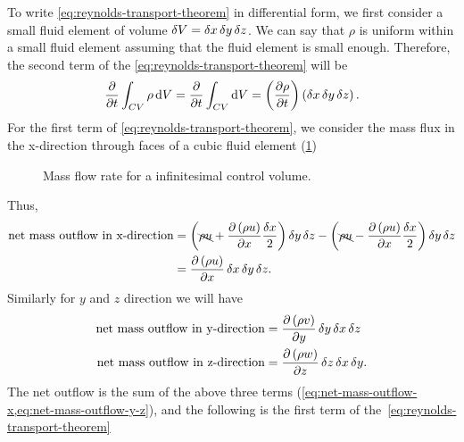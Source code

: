To write \cref{eq:reynolds-transport-theorem} in differential form, we first consider a small fluid element of volume \(\mathop{}\!\delta V = \mathop{}\!\delta x \mathop{}\!\delta y \mathop{}\!\delta z\). We can say that \(\rho\) is uniform within a small fluid element assuming that the fluid element is small enough. Therefore, the second  term of the \cref{eq:reynolds-transport-theorem} will be
%
\begin{equation}
	\frac{\partial}{\partial t} \int_{CV}{\rho \mathop{}\!\mathrm{d} V}
	= \frac{\partial}{\partial t} \int_{CV}{\mathop{}\!\mathrm{d} V}
	= \left(\frac{\partial\rho}{\partial t}\right) \left(\mathop{}\!\delta x \mathop{}\!\delta y \mathop{}\!\delta z\right).
\end{equation}
%
For the first term of \cref{eq:reynolds-transport-theorem}, we consider the mass flux in the x-direction through faces of a cubic fluid element (\cref{fig:infinitesimal-element-mass-flow-rate})
%
\begin{figure}[ht]
	\begin{center}
	\end{center}
	\caption{Mass flow rate for a infinitesimal control volume.}\label{fig:infinitesimal-element-mass-flow-rate}
\end{figure}
%
Thus,
%
\begin{equation}
	\begin{aligned}
		\text{net mass outflow in x-direction}
		 & = \left(\bcancel{\rho u} + \f{\p \left(\rho u\right)}{\p x}\f{\deltaop x}{2}\right) \deltaop y \deltaop z
		- \left(\bcancel{\rho u} - \f{\p \left(\rho u\right)}{\p x}\f{\deltaop x}{2}\right) \deltaop y \deltaop z    \\
		 & = \f{\p \left(\rho u\right)}{\p x} \deltaop x \deltaop y \deltaop z.
	\end{aligned}
	\label{eq:net-mass-outflow-x}
\end{equation}
%
Similarly for \(y\) and \(z\) direction we will have
%
\begin{equation}
	\begin{aligned}
		\text{net mass outflow in y-direction} & = \frac{\partial \left(\rho v\right)}{\partial y} \mathop{}\!\delta y \mathop{}\!\delta x \mathop{}\!\delta z  \\
		\text{net mass outflow in z-direction} & = \frac{\partial \left(\rho w\right)}{\partial z} \mathop{}\!\delta z \mathop{}\!\delta x \mathop{}\!\delta y.
	\end{aligned}
	\label{eq:net-mass-outflow-y-z}
\end{equation}
%
The net outflow is the sum of the above three terms (\cref{eq:net-mass-outflow-x,eq:net-mass-outflow-y-z}), and the following is the first term of the~\ref{eq:reynolds-transport-theorem}

